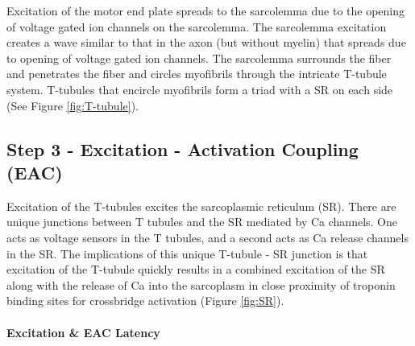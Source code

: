 Excitation of the motor end plate spreads to the sarcolemma due to the opening of voltage gated ion channels on the sarcolemma. The sarcolemma excitation creates a wave similar to that in the axon (but without myelin) that spreads due to opening of voltage gated ion channels. The sarcolemma surrounds the fiber and penetrates the fiber and circles myofibrils through the intricate T-tubule system. T-tubules that encircle myofibrils form a triad with a SR on each side (See Figure \ref{fig:T-tubule}).


\subsection{Step 3 - Excitation - Activation Coupling (EAC)}
Excitation of the T-tubules excites the sarcoplasmic reticulum (SR). There are unique junctions between T tubules and the SR mediated by Ca channels. One acts as voltage sensors in the T tubules, and a second acts as Ca release channels in the SR.\footnotemark{} The implications of this unique T-tubule - SR junction is that excitation of the T-tubule quickly results in a combined excitation of the SR along with the release of Ca into the sarcoplasm\footnotemark{} in close proximity of troponin binding sites for crossbridge activation (Figure \ref{fig:SR}).


\paragraph{Excitation \& EAC Latency}

